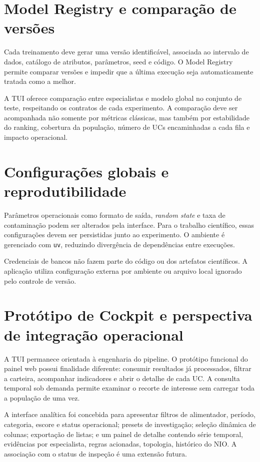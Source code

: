 \section{Model Registry e comparação de versões}\label{model-registry-e-comparauxe7uxe3o-de-versuxf5es}

Cada treinamento deve gerar uma versão identificável, associada ao intervalo de dados, catálogo de atributos, parâmetros, seed e código. O Model Registry permite comparar versões e impedir que a última execução seja automaticamente tratada como a melhor.

A TUI oferece comparação entre especialistas e modelo global no conjunto de teste, respeitando os contratos de cada experimento. A comparação deve ser acompanhada não somente por métricas clássicas, mas também por estabilidade do ranking, cobertura da população, número de UCs encaminhadas a cada fila e impacto operacional.

\section{Configurações globais e reprodutibilidade}\label{configurauxe7uxf5es-globais-e-reprodutibilidade}

Parâmetros operacionais como formato de saída, \emph{random state} e taxa de contaminação podem ser alterados pela interface. Para o trabalho científico, essas configurações devem ser persistidas junto ao experimento. O ambiente é gerenciado com \texttt{uv}, reduzindo divergência de dependências entre execuções.

Credenciais de bancos não fazem parte do código ou dos artefatos científicos. A aplicação utiliza configuração externa por ambiente ou arquivo local ignorado pelo controle de versão.

\section{Protótipo de Cockpit e perspectiva de integração operacional}\label{protuxf3tipo-de-cockpit-e-perspectiva-de-integrauxe7uxe3o-operacional}

A TUI permanece orientada à engenharia do pipeline. O protótipo funcional do painel web possui finalidade diferente: consumir resultados já processados, filtrar a carteira, acompanhar indicadores e abrir o detalhe de cada UC. A consulta temporal sob demanda permite examinar o recorte de interesse sem carregar toda a população de uma vez.

A interface analítica foi concebida para apresentar filtros de alimentador, período, categoria, escore e status operacional; presets de investigação; seleção dinâmica de colunas; exportação de listas; e um painel de detalhe contendo série temporal, evidências por especialista, regras acionadas, topologia, histórico do NIO. A associação com o status de inspeção é uma extensão futura.

